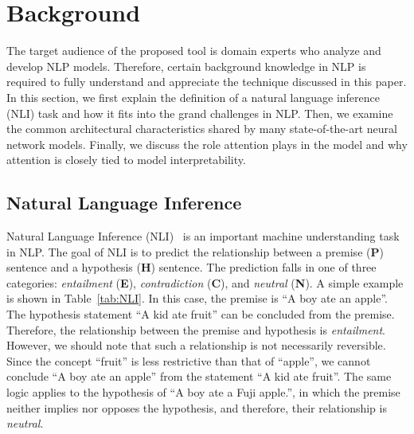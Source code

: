 \section{Background}
The target audience of the proposed tool is domain experts who analyze and develop NLP models. Therefore, certain background knowledge in NLP is required to fully understand and appreciate the technique discussed in this paper. In this section, we first explain the definition of a natural language inference (NLI) task and how it fits into the grand challenges in NLP. Then, we examine the common architectural characteristics shared by many state-of-the-art neural network models. Finally, we discuss the role attention plays in the model and why attention is closely tied to model interpretability.

\subsection{Natural Language Inference}
\label{sec:languageInference}
Natural Language Inference (NLI)~\cite{DaganRothSammons2013} is an important machine understanding task in NLP.
The goal of NLI is to predict the relationship between a premise (\textbf{P}) sentence and a hypothesis (\textbf{H}) sentence.
The prediction falls in one of three categories: \emph{entailment} (\textbf{E}), \emph{contradiction} (\textbf{C}), and \emph{neutral} (\textbf{N}).
A simple example is shown in Table~\ref{tab:NLI}.
In this case, the premise is ``A boy ate an apple''.
The hypothesis statement ``A kid ate fruit'' can be concluded from the premise. Therefore, the relationship between the premise and hypothesis is \emph{entailment}. However, we should note that such a relationship is not necessarily reversible. Since the concept ``fruit'' is less restrictive than that of ``apple'', we cannot conclude ``A boy ate an apple'' from the statement ``A kid ate fruit''. The same logic applies to the hypothesis of ``A boy ate a Fuji apple.'', in which the premise neither implies nor opposes the hypothesis, and therefore, their relationship is \emph{neutral}.

